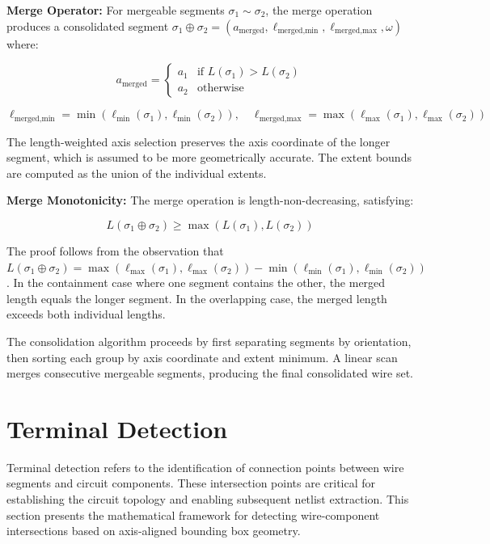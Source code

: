\textbf{Merge Operator:} For mergeable segments $\sigma_1 \sim \sigma_2$, the merge operation produces a consolidated segment $\sigma_1 \oplus \sigma_2 = (a_{\text{merged}}, \ell_{\text{merged,min}}, \ell_{\text{merged,max}}, \omega)$ where:

\begin{equation}
a_{\text{merged}} = \begin{cases} a_1 & \text{if } L(\sigma_1) > L(\sigma_2) \\ a_2 & \text{otherwise} \end{cases}
\label{eq:merge-axis}
\end{equation}

\begin{equation}
\ell_{\text{merged,min}} = \min(\ell_{\min}(\sigma_1), \ell_{\min}(\sigma_2)), \quad \ell_{\text{merged,max}} = \max(\ell_{\max}(\sigma_1), \ell_{\max}(\sigma_2))
\label{eq:merge-extent}
\end{equation}

The length-weighted axis selection preserves the axis coordinate of the longer segment, which is assumed to be more geometrically accurate. The extent bounds are computed as the union of the individual extents.

\textbf{Merge Monotonicity:} The merge operation is length-non-decreasing, satisfying:

\begin{equation}
L(\sigma_1 \oplus \sigma_2) \ge \max(L(\sigma_1), L(\sigma_2))
\label{eq:merge-monotonicity}
\end{equation}

The proof follows from the observation that $L(\sigma_1 \oplus \sigma_2) = \max(\ell_{\max}(\sigma_1), \ell_{\max}(\sigma_2)) - \min(\ell_{\min}(\sigma_1), \ell_{\min}(\sigma_2))$. In the containment case where one segment contains the other, the merged length equals the longer segment. In the overlapping case, the merged length exceeds both individual lengths.

The consolidation algorithm proceeds by first separating segments by orientation, then sorting each group by axis coordinate and extent minimum. A linear scan merges consecutive mergeable segments, producing the final consolidated wire set.

\section{Terminal Detection}

Terminal detection refers to the identification of connection points between wire segments and circuit components. These intersection points are critical for establishing the circuit topology and enabling subsequent netlist extraction. This section presents the mathematical framework for detecting wire-component intersections based on axis-aligned bounding box geometry.

